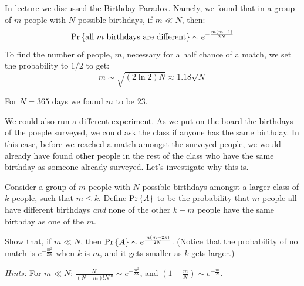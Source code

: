 \documentclass[12pt,twoside]{article}
\begin{document}
\begin{problem}{15}
In lecture we discussed the Birthday Paradox. Namely, we found that in a group of $m$ people with $N$ possible birthdays, if $m \ll N$, then:
\[
\mathop{\textup{Pr}}\nolimits\left\{\text{all $m$ birthdays are different}\right\} \sim e^{-\frac{m(m-1)}{2N}}
\]
To find the number of people, $m$, necessary for a half chance of a match, we set the probability to $1/2$ to get:
\[
m \sim \sqrt{(2\ln2)N} \approx 1.18\sqrt{N}
\]

For $N = 365$ days we found $m$ to be 23.

We could also run a different experiment. As we put on the board the birthdays of the poeple surveyed, we could ask the class if anyone has the same birthday. In this case, before we reached a match amongst the surveyed people, we would already have found other people in the rest of the class who have the same birthday as someone already surveyed. Let's investigate why this is.

\bparts
{} Consider a group of $m$ people with $N$ possible birthdays amongst a larger class of $k$ people, such that $m \leq k$. Define $\mathop{\textup{Pr}}\nolimits\left\{A\right\}$ to be the probability that $m$ people all have different birthdays \textit{and} none of the other $k-m$ people have the same birthday as one of the $m$.

Show that, if $m \ll N$, then $\mathop{\textup{Pr}}\nolimits\left\{A\right\} \sim e^{\frac{m(m-2k)}{2N}}$. (Notice that the probability of no match is $e^{-\frac{m^2}{2N}}$ when $k$ is $m$, and it gets smaller as $k$ gets larger.)

\hspace{0.5in} \textit{Hints:} For $m \ll N$: $\frac{N!}{(N-m)!N^m} \sim e^{-\frac{m^2}{2N}}$, and $(1-\frac{m}{N}) \sim e^{-\frac{m}{N}}$.



\end{problem}
\end{document}
